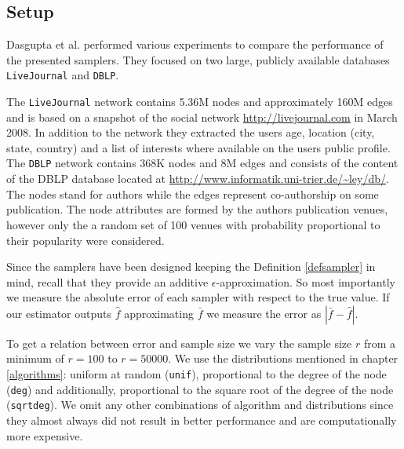 \subsection{Setup}
Dasgupta et al. \cite{dasgupta2012social} performed various experiments to compare the performance of the presented samplers.
They focused on two large, publicly available databases \texttt{LiveJournal} and \texttt{DBLP}.

The \texttt{LiveJournal} network contains 5.36M nodes and approximately 160M edges and is based on a snapshot of the social network \url{http://livejournal.com} in March 2008. In addition to the network they extracted the users age, location (city, state, country) and a list of interests where available on the users public profile.
The \texttt{DBLP} network contains 368K nodes and 8M edges and consists of the content of the DBLP database located at \url{http://www.informatik.uni-trier.de/~ley/db/}. The nodes stand for authors while the edges represent co-authorship on some publication. The node attributes are formed by the authors publication venues, however only the a random set of 100 venues with probability proportional to their popularity were considered. 

Since the samplers have been designed keeping the Definition \ref{defsampler} in mind, recall that they provide an additive $\epsilon$-approximation. So most importantly we measure the absolute error of each sampler with respect to the true value. If our estimator outputs $\hat{f}$ approximating $\bar{f}$ we measure the error as $|\bar{f}-\hat{f}|$.

To get a relation between error and sample size we vary the sample size $r$ from a minimum of $r = 100$ to $r = 50000$. We use the distributions mentioned in chapter \ref{algorithms}: uniform at random (\texttt{unif}), proportional to the degree of the node (\texttt{deg}) and additionally, proportional to the square root of the degree of the node (\texttt{sqrtdeg}). 
We omit any other combinations of algorithm and distributions since they almost always did not result in better performance and are computationally more expensive. 
